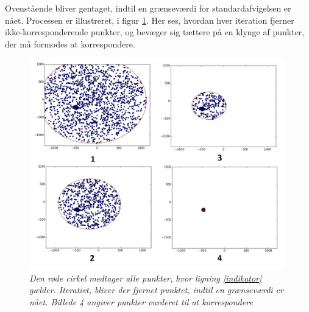 Ovenstående bliver gentaget, indtil en grænseværdi for standardafvigelsen er nået. Processen er illustreret, i figur \ref{fig:tilmatching}. Her ses, hvordan hver iteration fjerner ikke-korresponderende punkter, og bevæger sig tættere på en klynge af punkter, der må formodes at korrespondere.
\begin{figure}[H]
    \centering
    \includegraphics[width=0.99\textwidth]{fig/tilmatching.jpg}
     \vspace{-0.5em}
    \begin{center}    
       \caption{{\footnotesize \textit{Den røde cirkel medtager alle punkter, hvor ligning \eqref{indikator} gælder. Iterativt, bliver der fjernet punktet, indtil en grænseværdi er nået. Billede 4 angiver punkter vurderet til at korrespondere}}}
    \label{fig:tilmatching}
     \end{center}
     \vspace{-2.5em}
  \end{figure} \noindent

